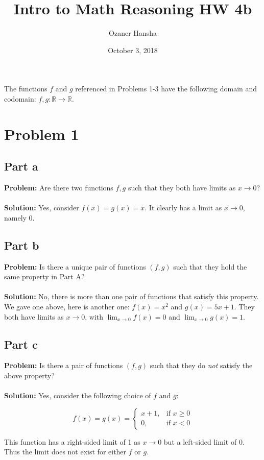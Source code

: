 \documentclass{article}
\begin{document}
\title{Intro to Math Reasoning HW 4b}
\author{Ozaner Hansha}
\date{October 3, 2018}
\maketitle

The functions $f$ and $g$ referenced in Problems 1-3 have the following domain and codomain: $f,g:\mathbb R\to \mathbb R$.

\section*{Problem 1}
\subsection*{Part a}
\textbf{Problem:} Are there two functions $f,g$ such that they both have limits as $x\to 0$?
\\\\
\textbf{Solution:} Yes, consider $f(x)=g(x)=x$. It clearly has a limit as $x\to 0$, namely 0.
\subsection*{Part b}
\textbf{Problem:} Is there a unique pair of functions $(f,g)$ such that they hold the same property in Part A?
\\\\
\textbf{Solution:} No, there is more than one pair of functions that satisfy this property. We gave one above, here is another one: $f(x)=x^2$ and $g(x)=5x+1$. They both have limits as $x\to 0$, with $\lim_{x\to 0}f(x)=0$ and $\lim_{x\to 0}g(x)=1$.
\subsection*{Part c}
\textbf{Problem:} Is there a pair of functions $(f,g)$ such that they do \textit{not} satisfy the above property?
\\\\
\textbf{Solution:} Yes, consider the following choice of $f$ and $g$:

$$f(x)=g(x)=\begin{cases}
    x+1, &\text{if } x\ge 0\\
    0, & \text{if }x<0
\end{cases}$$

This function has a right-sided limit of 1 as $x\to 0$ but a left-sided limit of 0. Thus the limit does not exist for either $f$ or $g$.
\end{document}
